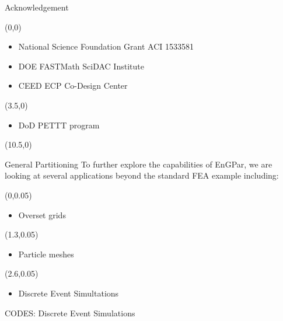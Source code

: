 \documentclass{beamer}
\begin{document}
\begin{textblock}{15.6}
\begin{textblock}{5.1}
    \begin{block}{\centering Acknowledgement}
      \begin{textblock}{3.5}(0,0)
      \begin{itemize}
      \item National Science Foundation Grant ACI 1533581
      \item DOE FASTMath SciDAC Institute
      \item CEED ECP Co-Design Center
      \end{itemize}
      \end{textblock}
      \begin{textblock}{1.5}(3.5,0)
        \begin{itemize}
          \item DoD PETTT program
        \end{itemize}
      \end{textblock}
      \vspace{4.2cm}
    \end{block}
  \end{textblock}
  \begin{textblock}{5.2}(10.5,0)
    \begin{block}{\centering General Partitioning}
      To further explore the capabilities of EnGPar, we are looking at several applications beyond the standard FEA example including:
      \begin{textblock}{2.5}(0,0.05)
        \begin{itemize}
        \item Overset grids 
        \end{itemize}
      \end{textblock}
      \begin{textblock}{2.5}(1.3,0.05)
        \begin{itemize}
        \item Particle meshes
        \end{itemize}
      \end{textblock}
      \begin{textblock}{2.5}(2.6,0.05)
        \begin{itemize}
        \item Discrete Event Simultations
        \end{itemize}
      \end{textblock}
      \vspace{1.6cm}
    \end{block}
    \begin{block}{\centering CODES: Discrete Event Simulations}

\end{block}
\end{textblock}
\end{textblock}
\end{document}
